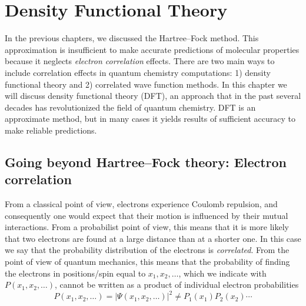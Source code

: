 \documentclass[../Main/notes.tex]{subfiles}
\begin{document}
\chapter{Density Functional Theory}

In the previous chapters, we discussed the Hartree--Fock method.
This approximation is insufficient to make accurate predictions of molecular properties because it neglects \emph{electron correlation} effects.
There are two main ways to include correlation effects in quantum chemistry computations: 1) density functional theory and 2) correlated wave function methods.
In this chapter we will discuss density functional theory (DFT), an approach that in the past several decades has revolutionized the field of quantum chemistry.
DFT is an approximate method, but in many cases it yields results of sufficient accuracy to make reliable predictions.

\section{Going beyond Hartree--Fock theory: Electron correlation}


From a classical point of view, electrons experience Coulomb repulsion, and consequently one would expect that their motion is influenced by their mutual interactions.
From a probabilist point of view, this means that it is more likely that two electrons are found at a large distance than at a shorter one.
In this case we say that the probability distribution of the electrons is \emph{correlated}.
From the point of view of quantum mechanics, this means that the probability of finding the electrons in positions/spin equal to $x_1, x_2, \ldots$, which we indicate with $P(x_1,x_2, \ldots)$, cannot be written as a product of individual electron probabilities
\begin{equation}
P(x_1,x_2, \ldots) = |\Psi(x_1,x_2, \ldots)|^2
\neq P_1(x_1) P_2(x_2) \cdots
\end{equation}
\end{document}
